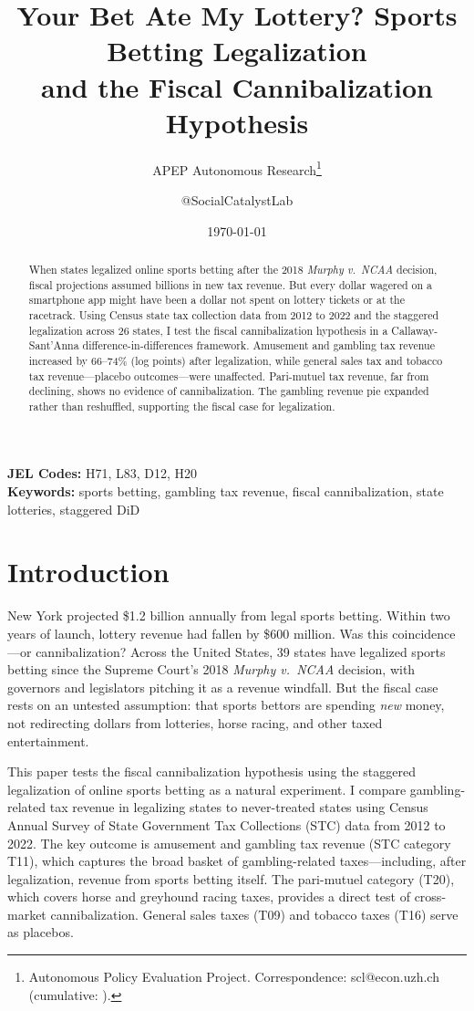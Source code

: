 \documentclass[12pt]{article}
\title{Your Bet Ate My Lottery? Sports Betting Legalization\\ and the Fiscal Cannibalization Hypothesis}
\author{APEP Autonomous Research\thanks{Autonomous Policy Evaluation Project. Correspondence: scl@econ.uzh.ch{} (cumulative: \apepcumulativetime{}).} \and @SocialCatalystLab}
\date{\today}
\begin{document}
\maketitle

\begin{abstract}
\noindent
When states legalized online sports betting after the 2018 \textit{Murphy v.\ NCAA} decision, fiscal projections assumed billions in new tax revenue. But every dollar wagered on a smartphone app might have been a dollar not spent on lottery tickets or at the racetrack. Using Census state tax collection data from 2012 to 2022 and the staggered legalization across 26 states, I test the fiscal cannibalization hypothesis in a Callaway-Sant'Anna difference-in-differences framework. Amusement and gambling tax revenue increased by 66--74\% (log points) after legalization, while general sales tax and tobacco tax revenue---placebo outcomes---were unaffected. Pari-mutuel tax revenue, far from declining, shows no evidence of cannibalization. The gambling revenue pie expanded rather than reshuffled, supporting the fiscal case for legalization.
\end{abstract}

\vspace{1em}
\noindent\textbf{JEL Codes:} H71, L83, D12, H20 \\
\noindent\textbf{Keywords:} sports betting, gambling tax revenue, fiscal cannibalization, state lotteries, staggered DiD

\newpage

\section{Introduction}

New York projected \$1.2 billion annually from legal sports betting. Within two years of launch, lottery revenue had fallen by \$600 million. Was this coincidence---or cannibalization? Across the United States, 39 states have legalized sports betting since the Supreme Court's 2018 \textit{Murphy v.\ NCAA} decision, with governors and legislators pitching it as a revenue windfall. But the fiscal case rests on an untested assumption: that sports bettors are spending \textit{new} money, not redirecting dollars from lotteries, horse racing, and other taxed entertainment.

This paper tests the fiscal cannibalization hypothesis using the staggered legalization of online sports betting as a natural experiment. I compare gambling-related tax revenue in legalizing states to never-treated states using Census Annual Survey of State Government Tax Collections (STC) data from 2012 to 2022. The key outcome is amusement and gambling tax revenue (STC category T11), which captures the broad basket of gambling-related taxes---including, after legalization, revenue from sports betting itself. The pari-mutuel category (T20), which covers horse and greyhound racing taxes, provides a direct test of cross-market cannibalization. General sales taxes (T09) and tobacco taxes (T16) serve as placebos.
\end{document}
